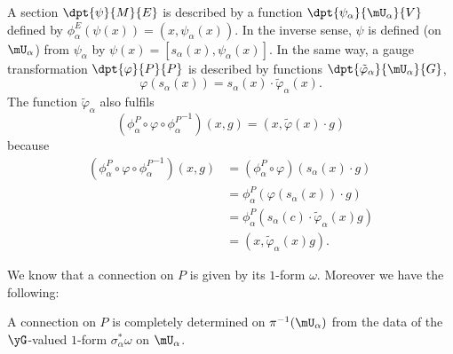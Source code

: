 A section $\dpt{\psi}{M}{E}$ is described by a function $\dpt{\psi_{\alpha}}{\mU_{\alpha}}{V}$ defined by $\phi^E_{\alpha}(\psi(x))=(x,\psi_{\alpha}(x))$.  In the inverse sense, $\psi$ is defined (on $\mU_{\alpha}$) from $\psi_{\alpha}$ by
$\psi(x)=[s_{\alpha}(x),\psi_{\alpha}(x)]$.
In the same way, a gauge transformation $\dpt{\varphi}{P}{P}$ is described by functions $\dpt{\tilde{\varphi}_{\alpha}}{\mU_{\alpha}}{G}$,
\begin{equation}
  \varphi(s_{\alpha}(x))=s_{\alpha}(x)\cdot\tilde{\varphi}_{\alpha}(x).
\end{equation}
The function $\tilde{\varphi}_{\alpha}$ also fulfils
\begin{equation}
  (\phi_{\alpha}^P\circ\varphi\circ{\phi_{\alpha}^P}^{-1})(x,g)=(x,\tilde{\varphi}(x)\cdot g)
\end{equation}
because
\begin{equation}
\begin{split}
  (\phi_{\alpha}^P\circ\varphi\circ{\phi_{\alpha}^P}^{-1})(x,g)&=(\phi_{\alpha}^P\circ\varphi)(s_{\alpha}(x)\cdot g)\\
                                                      &=\phi_{\alpha}^P( \varphi(s_{\alpha}(x))\cdot g )\\
                                                      &=\phi_{\alpha}^P( s_{\alpha}(c)\cdot\tilde{\varphi}_{\alpha}(x)g)\\
                                                      &=(x,\tilde{\varphi}_{\alpha}(x)g).
\end{split}
\end{equation}

We know that a connection on $P$ is given by its $1$-form $\omega$. Moreover we have the following:
\begin{proposition}
A connection on $P$ is completely determined on $\pi^{-1}(\mU_{\alpha})$ from the data of the $\yG$-valued $1$-form $\sigma_{\alpha}^*\omega$ on $\mU_{\alpha}$.
\end{proposition}

